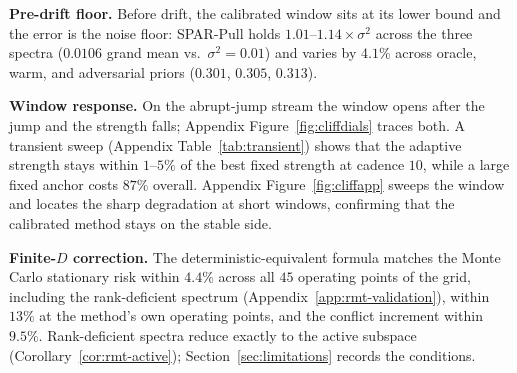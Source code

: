 \documentclass[10pt]{article}
\begin{document}
\textbf{Pre-drift floor.}
Before drift, the calibrated window sits at its lower bound and the error is the noise floor: SPAR-Pull holds $1.01$--$1.14\times\sigma^2$ across the three spectra ($0.0106$ grand mean vs.\ $\sigma^2=0.01$) and varies by $4.1\%$ across oracle, warm, and adversarial priors ($0.301$, $0.305$, $0.313$).

\textbf{Window response.}
On the abrupt-jump stream the window opens after the jump and the strength falls; Appendix Figure~\ref{fig:cliffdials} traces both.
A transient sweep (Appendix Table~\ref{tab:transient}) shows that the adaptive strength stays within $1$--$5\%$ of the best fixed strength at cadence $10$, while a large fixed anchor costs $87\%$ overall.
Appendix Figure~\ref{fig:cliffapp} sweeps the window and locates the sharp degradation at short windows, confirming that the calibrated method stays on the stable side.

\textbf{Finite-$D$ correction.}
The deterministic-equivalent formula matches the Monte Carlo stationary risk within $4.4\%$ across all $45$ operating points of the grid, including the rank-deficient spectrum (Appendix~\ref{app:rmt-validation}), within $13\%$ at the method's own operating points, and the conflict increment within $9.5\%$.
Rank-deficient spectra reduce exactly to the active subspace (Corollary~\ref{cor:rmt-active}); Section~\ref{sec:limitations} records the conditions.
\end{document}
